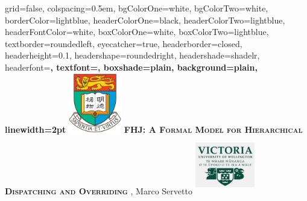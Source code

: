 \documentclass[portrait,final,a0paper,fontscale=0.277]{baposter}
\begin{document}
\begin{poster}%
  {
  grid=false,
  colspacing=0.5em,
  bgColorOne=white,
  bgColorTwo=white,
  borderColor=lightblue,
  headerColorOne=black,
  headerColorTwo=lightblue,
  headerFontColor=white,
  boxColorOne=white,
  boxColorTwo=lightblue,
  textborder=roundedleft,
  eyecatcher=true,
  headerborder=closed,
  headerheight=0.1\textheight,
  headershape=roundedright,
  headershade=shadelr,
  headerfont=\Large\bf\textsc, %
  textfont={\setlength{\parindent}{1.5em}},
  boxshade=plain,
  background=plain,
  linewidth=2pt
  }
  {\includegraphics[height=7em]{pdfs/hku.png}}
  {\bf\textsc{FHJ: A Formal Model for Hierarchical Dispatching and Overriding}\vspace{0.1em}}
  { {,} Marco Servetto }
  {%
    \includegraphics[width=7em,height=7em]{pdfs/vuw.png}
  }




    \newcommand{\colouredcircle}{%
      \tikz{\useasboundingbox (-0.2em,-0.32em) rectangle(0.2em,0.32em); \draw[draw=black,fill=lightblue,line width=0.03em] (0,0) circle(0.18em);}}


\end{poster}
\end{document}
